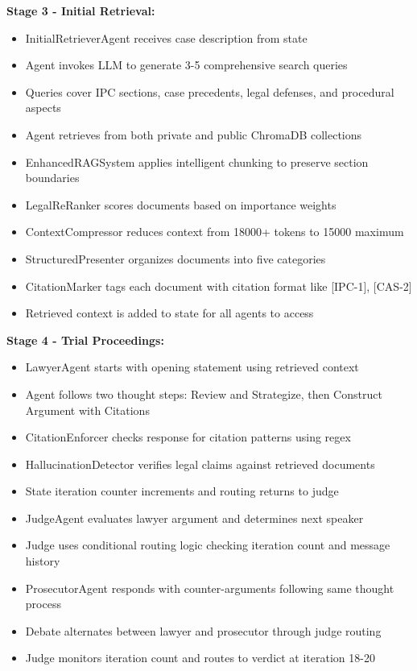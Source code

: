 \documentclass[12pt,singleside,a4paper]{article}
\begin{document}
\textbf{Stage 3 - Initial Retrieval:}
\begin{itemize}
\item InitialRetrieverAgent receives case description from state
\item Agent invokes LLM to generate 3-5 comprehensive search queries
\item Queries cover IPC sections, case precedents, legal defenses, and procedural aspects
\item Agent retrieves from both private and public ChromaDB collections
\item EnhancedRAGSystem applies intelligent chunking to preserve section boundaries
\item LegalReRanker scores documents based on importance weights
\item ContextCompressor reduces context from 18000+ tokens to 15000 maximum
\item StructuredPresenter organizes documents into five categories
\item CitationMarker tags each document with citation format like [IPC-1], [CAS-2]
\item Retrieved context is added to state for all agents to access
\end{itemize}

\textbf{Stage 4 - Trial Proceedings:}
\begin{itemize}
\item LawyerAgent starts with opening statement using retrieved context
\item Agent follows two thought steps: Review and Strategize, then Construct Argument with Citations
\item CitationEnforcer checks response for citation patterns using regex
\item HallucinationDetector verifies legal claims against retrieved documents
\item State iteration counter increments and routing returns to judge
\item JudgeAgent evaluates lawyer argument and determines next speaker
\item Judge uses conditional routing logic checking iteration count and message history
\item ProsecutorAgent responds with counter-arguments following same thought process
\item Debate alternates between lawyer and prosecutor through judge routing
\item Judge monitors iteration count and routes to verdict at iteration 18-20
\end{itemize}
\end{document}
